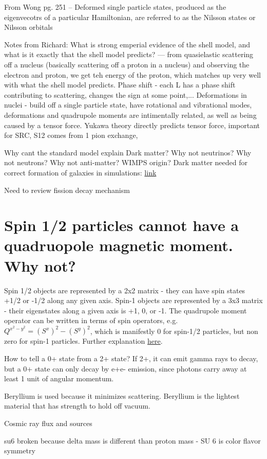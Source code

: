     
From Wong pg. 251 – Deformed single particle states, produced as the eigenvecotrs of a particular Hamiltonian, are referred to as the Nilsson states or Nilsson orbitals    
    
    
Notes from Richard:
    What is strong emperial evidence of the shell model, and what is it exactly that the shell model predicts? --- from quasielastic scattering off a nucleus (basically scattering off a proton in a nucleus) and observing the electron and proton, we get teh energy of the proton, which matches up very well with what the shell model predicts.
    Phase shift - each L has a phase shift contributing to scattering, changes the sign at some point,...
    Deformations in nuclei - build off a single particle state, have rotational and vibrational modes, deformations and quadrupole moments are intimentally related, as well as being caused by a tensor force. Yukawa theory directly predicts tensor force, important for SRC, S12 comes from 1 pion exchange, 
    

    Why cant the standard model explain Dark matter? Why not neutrinos? Why not neutrons? Why not anti-matter?
    WIMPS origin?
    Dark matter needed for correct formation of galaxies in simulations: \href{http://cosmicweb.uchicago.edu/filaments.html}{link}
    
    Need to review fission decay mechanism
    
    
    
    \section{Spin 1/2 particles cannot have a quadruopole magnetic moment. Why not?}
        Spin 1/2 objects are represented by a 2x2 matrix - they can have spin states +1/2 or -1/2 along any given axis. Spin-1 objects are represented by a 3x3 matrix - their eigenstates along a given axis is +1, 0, or -1. The quadrupole moment operator can be written in terms of spin operators, e.g. $Q^{x^2-y^2} = (S^x)^2 -(S^y)^2$, which is manifestly 0 for spin-1/2 particles, but non zero for spin-1 particles. Further explanation \href{https://physics.stackexchange.com/questions/176275/why-spin-1-2-objects-doesnt-have-quadrupolar-magnetic-moment}{here}. 
    
    
    
            How to tell a 0+ state from a 2+ state? If 2+, it can emit gamma rays to decay, but a 0+ state can only decay by e+e- emission, since photons carry away at least 1 unit of angular momentum. 
            
    
    Beryllium is used because it  minimizes scattering.  Beryllium is the lightest material that has strength to hold off vacuum.
    
    
    
    
Cosmic ray flux and sources

su6 broken because delta mass is different than proton mass - SU 6 is color flavor symmetry
    
 
    
    